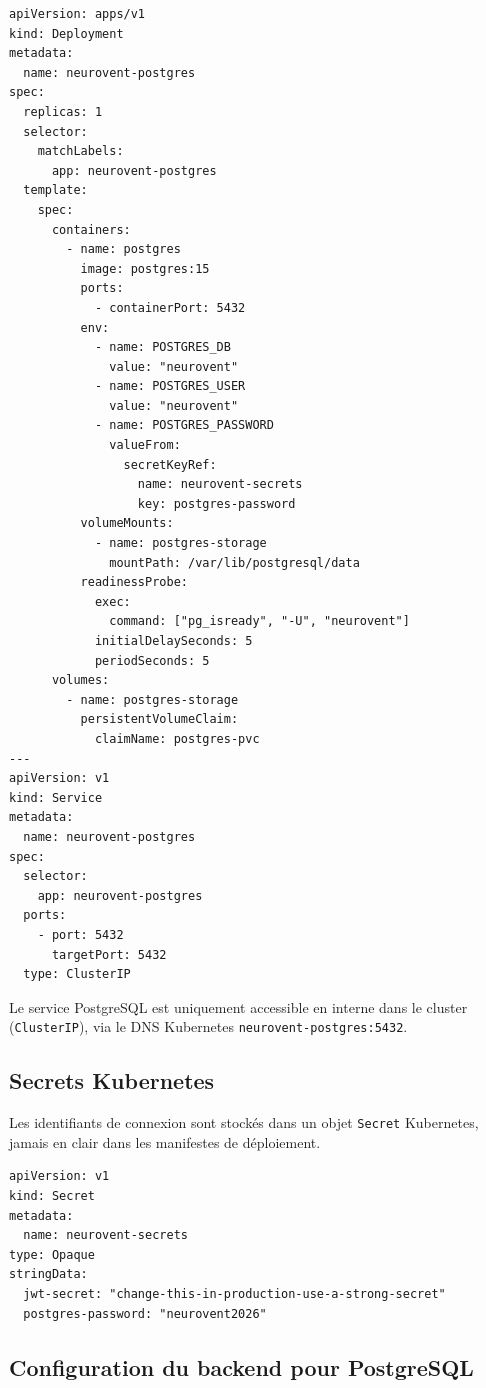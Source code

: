 \documentclass[12pt,a4paper]{article}
\begin{document}
\begin{lstlisting}[style=yaml, caption={k8s/postgres-deployment.yaml — Deployment et Service}]
apiVersion: apps/v1
kind: Deployment
metadata:
  name: neurovent-postgres
spec:
  replicas: 1
  selector:
    matchLabels:
      app: neurovent-postgres
  template:
    spec:
      containers:
        - name: postgres
          image: postgres:15
          ports:
            - containerPort: 5432
          env:
            - name: POSTGRES_DB
              value: "neurovent"
            - name: POSTGRES_USER
              value: "neurovent"
            - name: POSTGRES_PASSWORD
              valueFrom:
                secretKeyRef:
                  name: neurovent-secrets
                  key: postgres-password
          volumeMounts:
            - name: postgres-storage
              mountPath: /var/lib/postgresql/data
          readinessProbe:
            exec:
              command: ["pg_isready", "-U", "neurovent"]
            initialDelaySeconds: 5
            periodSeconds: 5
      volumes:
        - name: postgres-storage
          persistentVolumeClaim:
            claimName: postgres-pvc
---
apiVersion: v1
kind: Service
metadata:
  name: neurovent-postgres
spec:
  selector:
    app: neurovent-postgres
  ports:
    - port: 5432
      targetPort: 5432
  type: ClusterIP
\end{lstlisting}

Le service PostgreSQL est uniquement accessible en interne dans le cluster
(\texttt{ClusterIP}), via le DNS Kubernetes \texttt{neurovent-postgres:5432}.

\subsection{Secrets Kubernetes}

Les identifiants de connexion sont stockés dans un objet \texttt{Secret} Kubernetes,
jamais en clair dans les manifestes de déploiement.

\begin{lstlisting}[style=yaml, caption={k8s/secrets.yaml}]
apiVersion: v1
kind: Secret
metadata:
  name: neurovent-secrets
type: Opaque
stringData:
  jwt-secret: "change-this-in-production-use-a-strong-secret"
  postgres-password: "neurovent2026"
\end{lstlisting}

\subsection{Configuration du backend pour PostgreSQL}
\end{document}
